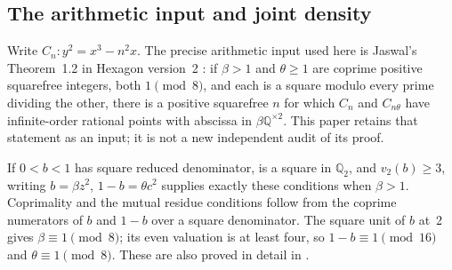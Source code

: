 \documentclass[11pt,a4paper]{article}
\theoremstyle{definition}\newtheorem{definition}[theorem]{Definition}
\theoremstyle{remark}\newtheorem{remark}[theorem]{Remark}
\newcommand{\Q}{\mathbb Q}\newcommand{\Z}{\mathbb Z}
\begin{document}
\subsection{The arithmetic input and joint density}
Write $C_n:y^2=x^3-n^2x$. The precise arithmetic input used here is
Jaswal's Theorem~1.2 in Hexagon version~2 \cite{Jaswal}: if
$\beta>1$ and $\theta\ge1$ are coprime positive squarefree integers,
both $1\pmod8$, and each is a square modulo every prime dividing the
other, there is a positive squarefree $n$ for which $C_n$ and
$C_{n\theta}$ have infinite-order rational points with abscissa in
$\beta\Q^{\times2}$. This paper retains that statement as an input;
it is not a new independent audit of its proof.

If $0<b<1$ has square reduced denominator, is a square in $\Q_2$, and
$v_2(b)\ge3$, writing $b=\beta z^2$, $1-b=\theta c^2$ supplies exactly
these conditions when $\beta>1$. Coprimality and the mutual residue
conditions follow from the coprime numerators of $b$ and $1-b$ over a
square denominator. The square unit of $b$ at~2 gives
$\beta\equiv1\pmod8$; its even valuation is at least four, so
$1-b\equiv1\pmod {16}$ and $\theta\equiv1\pmod8$. These are also
proved in detail in \cite{Congruent}.
\end{document}
